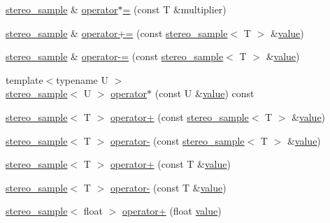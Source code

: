 \begin{DoxyCompactItemize}
\hyperlink{structdsp_1_1stereo__sample}{stereo\+\_\+sample} \& \hyperlink{structdsp_1_1stereo__sample_a07354a18f3eb6b5579791aa119fb36fb}{operator$\ast$=} (const T \&multiplier)
\item 
\hyperlink{structdsp_1_1stereo__sample}{stereo\+\_\+sample} \& \hyperlink{structdsp_1_1stereo__sample_a191a1dad0717772f763a2b52556f7281}{operator+=} (const \hyperlink{structdsp_1_1stereo__sample}{stereo\+\_\+sample}$<$ T $>$ \&\hyperlink{tk_8h_a177a0765f574ef6642002696d9cd82d0}{value})
\item 
\hyperlink{structdsp_1_1stereo__sample}{stereo\+\_\+sample} \& \hyperlink{structdsp_1_1stereo__sample_a4a96f575237d712f41973333023be7b4}{operator-\/=} (const \hyperlink{structdsp_1_1stereo__sample}{stereo\+\_\+sample}$<$ T $>$ \&\hyperlink{tk_8h_a177a0765f574ef6642002696d9cd82d0}{value})
\item 
{\footnotesize template$<$typename U $>$ }\\\hyperlink{structdsp_1_1stereo__sample}{stereo\+\_\+sample}$<$ U $>$ \hyperlink{structdsp_1_1stereo__sample_a7cd922059e31dc561f2c1aacf522d132}{operator$\ast$} (const U \&\hyperlink{tk_8h_a177a0765f574ef6642002696d9cd82d0}{value}) const 
\item 
\hyperlink{structdsp_1_1stereo__sample}{stereo\+\_\+sample}$<$ T $>$ \hyperlink{structdsp_1_1stereo__sample_a4dd61a95133277cd2e3fe345cb17f5f5}{operator+} (const \hyperlink{structdsp_1_1stereo__sample}{stereo\+\_\+sample}$<$ T $>$ \&\hyperlink{tk_8h_a177a0765f574ef6642002696d9cd82d0}{value})
\item 
\hyperlink{structdsp_1_1stereo__sample}{stereo\+\_\+sample}$<$ T $>$ \hyperlink{structdsp_1_1stereo__sample_afc1f323b87a8cfe546d796d6b7949fdd}{operator-\/} (const \hyperlink{structdsp_1_1stereo__sample}{stereo\+\_\+sample}$<$ T $>$ \&\hyperlink{tk_8h_a177a0765f574ef6642002696d9cd82d0}{value})
\item 
\hyperlink{structdsp_1_1stereo__sample}{stereo\+\_\+sample}$<$ T $>$ \hyperlink{structdsp_1_1stereo__sample_afc698f85d35454bd6cc5c52a29f4623a}{operator+} (const T \&\hyperlink{tk_8h_a177a0765f574ef6642002696d9cd82d0}{value})
\item 
\hyperlink{structdsp_1_1stereo__sample}{stereo\+\_\+sample}$<$ T $>$ \hyperlink{structdsp_1_1stereo__sample_a55ce56f876f111ea9c15b343c1ff0a90}{operator-\/} (const T \&\hyperlink{tk_8h_a177a0765f574ef6642002696d9cd82d0}{value})
\item 
\hyperlink{structdsp_1_1stereo__sample}{stereo\+\_\+sample}$<$ float $>$ \hyperlink{structdsp_1_1stereo__sample_af8444c6f9d75fbb5c671a73f975f1d16}{operator+} (float \hyperlink{tk_8h_a177a0765f574ef6642002696d9cd82d0}{value})

\end{DoxyCompactItemize}
